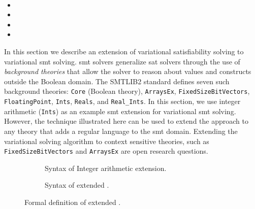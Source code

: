 ~\label{chapter:vsmt}

\begin{itemize}
\item {}
\item {}
\item {}
\item {}
\end{itemize}

In this section we describe an extension of variational satisfiability solving
to variational \ac{smt} solving.
%
%
\ac{smt} solvers generalize \ac{sat} solvers through the use of
\emph{background theories} that allow the solver to reason about values and
constructs outside the Boolean domain. The SMTLIB2 standard defines seven such
background theories: \texttt{Core} (Boolean theory), \texttt{ArraysEx},
\texttt{FixedSizeBitVectors}, \texttt{FloatingPoint}, \texttt{Ints},
\texttt{Reals}, and \texttt{Real\_Ints}. In this section, we use integer
arithmetic (\texttt{Ints}) as an example \ac{smt} extension for variational
\ac{smt} solving. However, the technique illustrated here can be used to extend
the approach to any theory that adds a regular language to the \ac{smt} domain.
%
%
Extending the variational solving algorithm to context sensitive
theories, such as \texttt{FixedSizeBitVectors} and \texttt{ArraysEx} are open
research questions.

\begin{figure}
  \begin{subfigure}[t]{\linewidth}
    \centering
    
    \caption{Syntax of Integer arithmetic extension.}%
    \label{fig:arith:stx}
  \end{subfigure}
  \begin{subfigure}[t]{\linewidth}
    
    \centering
    \caption{Syntax of extended \vpl{}.}%
    \label{fig:arith:vpl}
  \end{subfigure}
  \caption{Formal definition of extended \vpl{}.}%
  \label{fig:ex:vpl}
\end{figure}

